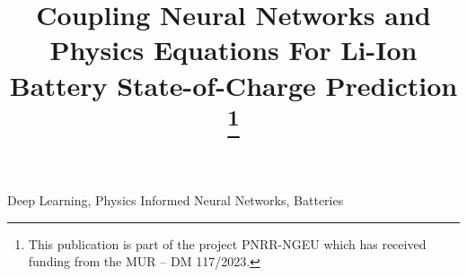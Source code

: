 \documentclass[conference]{IEEEtran}
\begin{document}
\title{Coupling Neural Networks and Physics Equations For Li-Ion Battery State-of-Charge Prediction
\thanks{This publication is part of the project PNRR-NGEU which has received funding from the MUR – DM 117/2023.}
}

\maketitle
{\color{lightgray}}  %

\begin{IEEEkeywords}
\color{lightgray}Deep Learning, Physics Informed Neural Networks, Batteries
\end{IEEEkeywords}
\vspace{-0.5cm}

{\color{lightgray}}   %

{\color{lightgray}}      %
{\color{lightgray}}  %
\newpage






\end{document}
